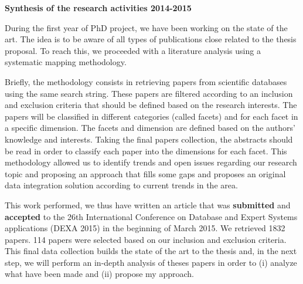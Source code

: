 \documentclass[12pt,a4paper,oneside]{report}
\begin{document}
\begin{flushleft}
\textbf{Synthesis of the research activities 2014-2015}\\
\end{flushleft}
During the first year of PhD project, we have been working on the state of the art. The idea is to be aware of all types of publications close related to the thesis proposal. To reach this, we proceeded with a literature analysis using a systematic mapping methodology. 

Briefly, the methodology consists in retrieving papers from scientific databases using the same search string. These papers are filtered according to an inclusion and exclusion criteria that should be defined based on the research interests. The papers will be classified in different categories (called facets) and for each facet in a specific dimension. The facets and dimension are defined based on the authors’ knowledge and interests. Taking the final papers collection, the abstracts should be read in order to classify each paper into the dimensions for each facet. 
This methodology allowed us to identify trends and open issues regarding our research topic and proposing an approach that fills some gaps and proposes an original data integration solution according to current trends in the area.


This work performed, we thus have written an article that was \textbf{submitted} and \textbf{accepted} to the 26th International Conference on Database and Expert Systems applications (DEXA 2015) in the beginning of March 2015. We retrieved 1832 papers. 114 papers were selected based on our inclusion and exclusion criteria. This final data collection builds the state of the art to the thesis and, in the next step, we will perform an in-depth analysis of theses papers in order to (i) analyze what have been made and (ii) propose my approach.  

\end{document}
